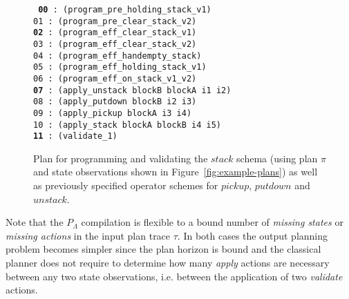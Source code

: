 \begin{figure}[hbt!]
{\footnotesize\tt
  {\bf 00} : (program\_pre\_holding\_stack\_v1) \\
     01 : (program\_pre\_clear\_stack\_v2)\\
  {\bf 02} : (program\_eff\_clear\_stack\_v1)\\
    03 : (program\_eff\_clear\_stack\_v2)\\
    04 : (program\_eff\_handempty\_stack)\\
    05 : (program\_eff\_holding\_stack\_v1)\\
    06 : (program\_eff\_on\_stack\_v1\_v2)\\
    {\bf 07} : (apply\_unstack blockB blockA i1 i2)\\
    08 : (apply\_putdown blockB i2 i3)\\
    09 : (apply\_pickup blockA i3 i4)\\
    10 : (apply\_stack blockA blockB i4 i5)\\
    {\bf 11} : (validate\_1)
}
 \caption{\small Plan for programming and validating the $stack$ schema (using plan $\pi$ and state observations shown in Figure~\ref{fig:example-plans}) as well as previously specified operator schemes for $pickup$, $putdown$ and $unstack$.}
\label{fig:plan-lplan}
\end{figure}

Note that the $P_{\Lambda}$ compilation is flexible to a bound number of {\em missing states} or {\em missing actions} in the input plan trace $\tau$. In both cases the output planning problem becomes simpler since the plan horizon is bound and the classical planner does not require to determine how many {\em apply} actions are necessary between any two state observations, i.e. between the application of two {\em validate} actions. 

